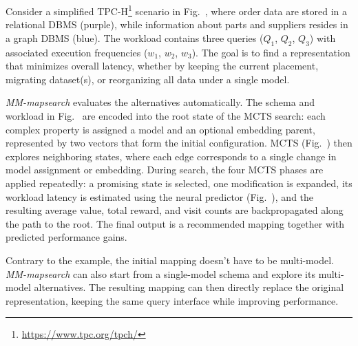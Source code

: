 \begin{example}
Consider a simplified TPC-H\footnote{\url{https://www.tpc.org/tpch/}} scenario in Fig.~, where order data are stored in a relational DBMS (purple), while information about parts and suppliers resides in a graph DBMS (blue). The workload contains three queries ($Q_1$, $Q_2$, $Q_3$) with associated execution frequencies ($w_1$, $w_2$, $w_3$). The goal is to find a representation that minimizes overall latency, whether by keeping the current placement, migrating dataset(s), or reorganizing all data under a single model.

\textit{MM-mapsearch} evaluates the alternatives automatically. The schema and workload in Fig.~ are encoded into the root state of the MCTS search: each complex property is assigned a model and an optional embedding parent, represented by two vectors that form the initial configuration. MCTS (Fig.~) then explores neighboring states, where each edge corresponds to a single change in model assignment or embedding. During search, the four MCTS phases are applied repeatedly: a promising state is selected, one modification is expanded, its workload latency is estimated using the neural predictor (Fig.~), and the resulting average value, total reward, and visit counts are backpropagated along the path to the root. The final output is a recommended mapping together with predicted performance gains.
\end{example}

Contrary to the example, the initial mapping doesn't have to be multi-model. \textit{MM-mapsearch} can also start from a single-model schema and explore its multi-model alternatives. The resulting mapping can then directly replace the original representation, keeping the same query interface while improving performance.




